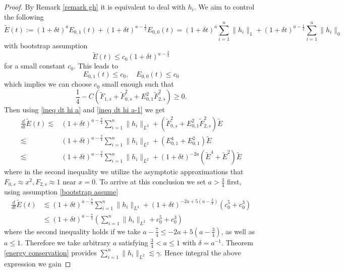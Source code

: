 \documentclass[11pt]{article}
\newcommand{\TF}{\tilde{F}}
\newcommand{\TE}{\tilde{E}}
\theoremstyle{definition}
\numberwithin{equation}{section}
\begin{document}
\begin{proof}
    By Remark \ref{remark gh} it is equivalent to deal with $h_i$. We aim to control the following
    \begin{equation}
        \TE(t):=(1+\delta t)^aE_{0,1}(t)+(1+\delta t)^{a-\frac{1}{2}}E_{0,0}(t)=(1+\delta t)^a\sum_{i=1}^n\|h_i\|_1+(1+\delta t)^{a-\frac{1}{2}}\sum_{i=1}^n\|h_i\|_0
    \end{equation}
    with bootstrap assumption
    \begin{equation}\label{bootstrap assume}
        \TE(t)\leq c_0(1+\delta t)^{a-\frac{3}{4}}
    \end{equation}
    for a small constant $c_0$. This leads to
    \begin{equation}
        E_{0,1}(t)\leq c_0,\quad E_{0,0}(t)\leq c_0
    \end{equation}
    which implies we can choose $c_0$ small enough such that
    \begin{equation}
        \frac{1}{4}-C\left(\TF_{1,s}+\TF_{0,s}^2+E_{0,1}^2\TF_{2,s}^2\right)\geq0.
    \end{equation}    
    Then using \eqref{ineq dt hi a} and \eqref{ineq dt hi a-1} we get
    \begin{equation}
        \begin{aligned}
            \frac{d}{dt}\TE(t)\lesssim&(1+\delta t)^{a-\frac{7}{4}}\sum_{i=1}^n\|h_i\|_{L^2}+\left(\TF_{0,s}^2+E_{0,1}^2\TF_{2,s}^2\right)\TE
            \\
            \lesssim&(1+\delta t)^{a-\frac{7}{4}}\sum_{i=1}^n\|h_i\|_{L^2}+\left(E_{0,1}^4+E_{0,1}^2\right)\TE\\
            \lesssim&(1+\delta t)^{a-\frac{7}{4}}\sum_{i=1}^n\|h_i\|_{L^2}+(1+\delta t)^{-2a}(\TE^4+\TE^2)\TE
        \end{aligned}
    \end{equation}
    where in the second inequality we utilize the asymptotic approximations that $F_{0,s}\approx x^2,F_{2,s}\approx 1$ near $x=0$. To arrive at this conclusion we set $a>\frac{3}{4}$ first, using assumption \eqref{bootstrap assume}
    \begin{align}
        \frac{d}{dt}\TE(t)&\lesssim(1+\delta t)^{a-\frac{7}{4}}\sum_{i=1}^n\|h_i\|_{L^2}+(1+\delta t)^{-2a+5(a-\frac{3}{4})}(c_0^5+c_0^3)\\
        &\leq(1+\delta t)^{a-\frac{7}{4}}\left(\sum_{i=1}^n\|h_i\|_{L^2}+c_0^5+c_0^3\right)
    \end{align}
    where the second inequality holds if we take $a-\frac{7}{4}\leq-2a+5(a-\frac{3}{4})$, as well as $a\leq 1$. Therefore we take arbitrary $a$ satisfying $\frac{3}{4}<a\leq1$ with $\delta=a^{-1}$. Theorem \ref{energy conservation} provides $\sum_{i=1}^n\|h_i\|_{L^2}\lesssim\gamma$. Hence integral the above expression we gain

\end{proof}
\end{document}
